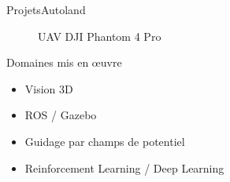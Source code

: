 \begin{frame}{Projets}{Autoland}
\begin{minipage}{0.48\textwidth}
\begin{figure}
            \caption{UAV DJI Phantom 4 Pro}
        \end{figure}
        \begin{block}{Domaines mis en \oe uvre}
            \begin{itemize}
                \item Vision 3D \\
                \item ROS / Gazebo \\
                \item Guidage par champs de potentiel \\
                \item Reinforcement Learning / Deep Learning
            \end{itemize}
        \end{block}
    \end{minipage}
\end{frame}